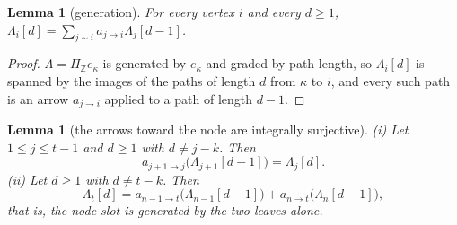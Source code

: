 \documentclass[reqno]{amsart}
\theoremstyle{plain}
\newtheorem{lemma}[theorem]{Lemma}
\theoremstyle{definition}
\newcommand{\ka}{\kappa}
\newcommand{\Pia}{\Pi}
\begin{document}
\begin{lemma}[generation]\label{lem:gen}
For every vertex $i$ and every $d\ge1$,
$\Lambda_i[d]=\sum_{j\sim i}a_{j\to i}\Lambda_j[d-1]$.
\end{lemma}

\begin{proof}
$\Lambda=\Pia_{\mathbb{Z}}e_\ka$ is generated by $e_\ka$ and graded by path
length, so $\Lambda_i[d]$ is spanned by the images of the paths of length $d$
from $\ka$ to $i$, and every such path is an arrow $a_{j\to i}$ applied to a
path of length $d-1$.
\end{proof}

\begin{lemma}[the arrows toward the node are integrally surjective]
\label{lem:chainsurj}
\textup{(i)}  Let $1\le j\le t-1$ and $d\ge1$ with $d\ne j-k$.  Then
\[
    a_{j+1\to j}\bigl(\Lambda_{j+1}[d-1]\bigr)=\Lambda_j[d].
\]
\textup{(ii)}  Let $d\ge1$ with $d\ne t-k$.  Then
\[
    \Lambda_t[d]=a_{n-1\to t}\bigl(\Lambda_{n-1}[d-1]\bigr)
                +a_{n\to t}\bigl(\Lambda_{n}[d-1]\bigr),
\]
that is, the node slot is generated by the two leaves alone.
\end{lemma}
\end{document}
